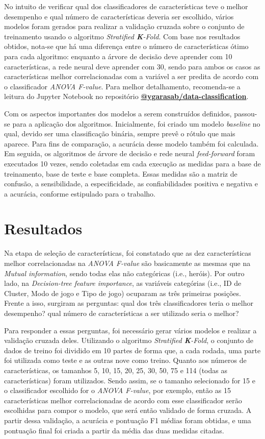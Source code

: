 \documentclass[12pt]{article}
\begin{document}
No intuito de verificar qual dos classificadores de características teve o melhor desempenho e qual número de características deveria ser escolhido, vários modelos foram gerados para realizar a validação cruzada sobre o conjunto de treinamento usando o algoritmo \textit{Stratified \textbf{K}-Fold}. Com base nos resultados obtidos, nota-se que há uma diferença entre o número de características ótimo para cada algoritmo: enquanto a árvore de decisão deve aprender com 10 características, a rede neural deve aprender com 30, sendo para ambos os casos as características melhor correlacionadas com a variável a ser predita de acordo com o classificador \textit{ANOVA F-value}. Para melhor detalhamento, recomenda-se a leitura do Jupyter Notebook no repositório \textbf{\href{https://github.com/ygarasab/data-classification}{@ygarasab/data-classification}}.

Com os aspectos importantes dos modelos a serem construídos definidos, passou-se para a aplicação dos algoritmos. Inicialmente, foi criado um modelo \textit{baseline} no qual, devido ser uma classificação binária, sempre prevê o rótulo que mais aparece. Para fins de comparação, a acurácia desse modelo também foi calculada. Em seguida, os algoritmos de árvore de decisão e rede neural \textit{feed-forward} foram executados 10 vezes, sendo coletadas em cada execução as medidas para a base de treinamento, base de teste e base completa. Essas medidas são a matriz de confusão, a sensibilidade, a especificidade, as confiabilidades positiva e negativa e a acurácia, conforme estipulado para o trabalho. 
	
\section{Resultados}\label{sec:resultados}
Na etapa de seleção de características, foi constatado que as dez características melhor correlacionadas na \textit{ANOVA F-value} são basicamente as mesmas que na \textit{Mutual information}, sendo todas elas não categóricas (i.e., heróis). Por outro lado, na \textit{Decision-tree feature importance}, as variáveis categórias (i.e., ID de Cluster, Modo de jogo e Tipo de jogo) ocuparam as três primeiras posições. Frente a isso, surgiram as perguntas: qual dos três classificadores teria o melhor desempenho? qual número de características a ser utilizado seria o melhor?

Para responder a essas perguntas, foi necessário gerar vários modelos e realizar a validação cruzada deles. Utilizando o algoritmo \textit{Stratified \textbf{K}-Fold}, o conjunto de dados de treino foi dividido em 10 partes de forma que, a cada rodada, uma parte foi utilizada como teste e as outras nove como treino. Quanto aos números de características, os tamanhos 5, 10, 15, 20, 25, 30, 50, 75 e 114 (todas as características) foram utilizados. Sendo assim, se o tamanho selecionado for 15 e o classificador escolhido for o \textit{ANOVA F-value}, por exemplo, então as 15 características melhor correlacionadas de acordo com esse classificador serão escolhidas para compor o modelo, que será então validado de forma cruzada. A partir dessa validação, a acurácia e pontuação F1 médias foram obtidas, e uma pontuação final foi criada a partir da média das duas medidas citadas.
\end{document}

